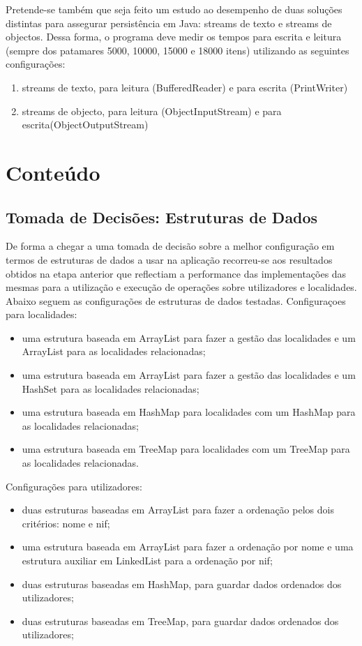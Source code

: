 \documentclass[a5paper,twocolumn, 11pt]{article}
\begin{document}
Pretende-se também que seja feito um estudo ao desempenho de duas soluções distintas para assegurar persistência em Java: streams de texto e streams de objectos. Dessa forma, o programa deve medir os tempos para escrita e leitura (sempre dos patamares 5000, 10000, 15000 e 18000 itens) utilizando as seguintes
configurações:
\begin{enumerate}
	\item{streams de texto, para leitura (BufferedReader) e para escrita (PrintWriter)}
    \item{streams de objecto, para leitura (ObjectInputStream) e para escrita(ObjectOutputStream)}
\end{enumerate}
    


\clearpage
\newpage
\section{Conteúdo}
\subsection{Tomada de Decisões: Estruturas de Dados}
De forma a chegar a uma tomada de decisão sobre a melhor configuração em termos de estruturas de dados a usar na aplicação recorreu-se aos resultados obtidos na etapa anterior que reflectiam a performance das implementações das mesmas para a utilização e execução de operações sobre utilizadores e localidades. Abaixo seguem as configurações de estruturas de dados testadas.
Configuraçoes para localidades:
\begin{itemize}
    \item{uma estrutura baseada em ArrayList para fazer a gestão das localidades e um ArrayList para as localidades relacionadas;}
    \item{uma estrutura baseada em ArrayList para fazer a gestão das localidades e um HashSet para as localidades relacionadas;}
    \item{uma estrutura baseada em HashMap para localidades com um HashMap
para as localidades relacionadas;}
    \item{uma estrutura baseada em TreeMap para localidades com um TreeMap
para as localidades relacionadas.}
\end{itemize}

Configurações para utilizadores:
\begin{itemize}
    \item{duas estruturas baseadas em ArrayList para fazer a ordenação pelos
dois critérios: nome e nif;}
    \item{uma estrutura baseada em ArrayList para fazer a ordenação por nome
e uma estrutura auxiliar em LinkedList para a ordenação por nif;}
    \item{duas estruturas baseadas em HashMap, para guardar dados ordenados dos utilizadores;}
    \item{duas estruturas baseadas em TreeMap, para guardar dados ordenados dos utilizadores;}
\end{itemize}
\end{document}
